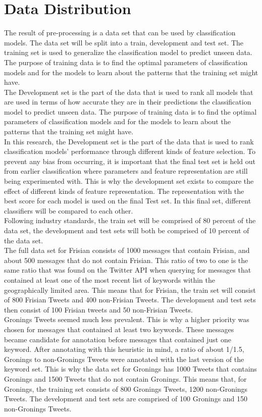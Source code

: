 \documentclass[
10pt, %
a4paper, %
oneside, %
headinclude,footinclude, %
] {book}%
\begin{document}
\section{Data Distribution}
The result of pre-processing is a data set that can be used by classification models. The data set will be split into a train, development and test set. The training set is used to generalize the classification model to predict unseen data. The purpose of training data is to find the optimal parameters of classification models and for the models to learn about the patterns that the training set might have. \\
The Development set is the part of the data that is used to rank all models that are used in terms of how accurate they are in their predictions the classification model to predict unseen data. The purpose of training data is to find the optimal parameters of classification models and for the models to learn about the patterns that the training set might have. \\
In this research, the Development set is the part of the data that is used to rank classification models' performance through different kinds of feature selection. To prevent any bias from occurring, it is important that the final test set is held out from earlier classification where parameters and feature representation are still being experimented with. This is why the development set exists to compare the effect of different kinds of feature representation. The representation with the best score for each model is used on the final Test set. In this final set, different classifiers will be compared to each other. \\
Following industry standards, the train set will be comprised of 80 percent of the data set, the development and test sets will both be comprised of 10 percent of the data set. \\
The full data set for Frisian consists of 1000 messages that contain Frisian, and about 500 messages that do not contain Frisian. This ratio of two to one is the same ratio that was found on the Twitter API when querying for messages that contained at least one of the most recent list of keywords within the geographically limited area. This means that for Frisian, the train set will consist of 800 Frisian Tweets and 400 non-Frisian Tweets. The development and test sets then consist of 100 Frisian tweets and 50 non-Frisian Tweets.\\
Gronings Tweets seemed much less prevalent. This is why a higher priority was chosen for messages that contained at least two keywords. These messages became candidate for annotation before messages that contained just one keyword. After annotating with this heuristic in mind, a ratio of about 1/1.5, Gronings to non-Gronings Tweets were annotated with the last version of the keyword set. This is why the data set for Gronings has 1000 Tweets that contains Gronings and 1500 Tweets that do not contain Gronings. This means that, for Gronings, the training set consists of 800 Gronings Tweets, 1200 non-Gronings Tweets. The development and test sets are comprised of 100 Gronings and 150 non-Gronings Tweets.
\end{document}
